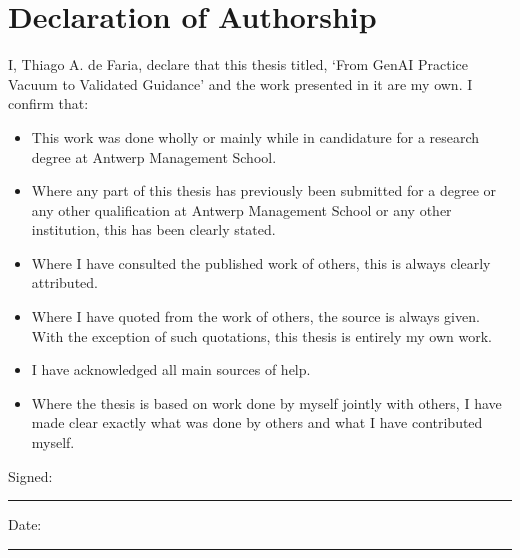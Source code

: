 \clearpage

\section*{Declaration of Authorship}

I, Thiago A. de Faria, declare that this thesis titled, `From GenAI Practice Vacuum to Validated Guidance' and the work presented in it are my own. I confirm that:

\begin{itemize}
  \item This work was done wholly or mainly while in candidature for a research degree at Antwerp Management School.
  \item Where any part of this thesis has previously been submitted for a degree or any other qualification at Antwerp Management School or any other institution, this has been clearly stated.
  \item Where I have consulted the published work of others, this is always clearly attributed.
  \item Where I have quoted from the work of others, the source is always given. With the exception of such quotations, this thesis is entirely my own work.
  \item I have acknowledged all main sources of help.
  \item Where the thesis is based on work done by myself jointly with others, I have made clear exactly what was done by others and what I have contributed myself.
\end{itemize}

\vspace{2cm}

\noindent Signed: \rule{6cm}{0.4pt}

\vspace{1cm}

\noindent Date: \rule{6cm}{0.4pt}

\newpage\thispagestyle{empty}\mbox{}\newpage


